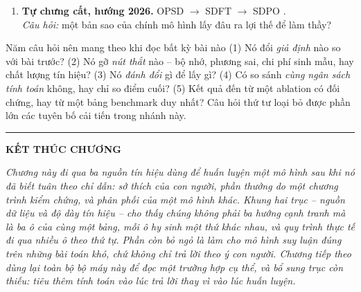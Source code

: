 \begin{enumerate}
	\item \textbf{Tự chưng cất, hướng 2026.} OPSD \cite{zhao2026opsd} $\rightarrow$ SDFT \cite{shenfeld2026sdft} $\rightarrow$ SDPO \cite{huebotter2026sdpo}.\\
	\emph{Câu hỏi:} một bản sao của chính mô hình lấy đâu ra lợi thế để làm thầy?
\end{enumerate}

\begin{deepdive}{Năm câu hỏi nên mang theo khi đọc bất kỳ bài nào}
(1) Nó đổi \emph{giả định} nào so với bài trước? (2) Nó gỡ \emph{nút thắt} nào -- bộ nhớ, phương sai, chi phí sinh mẫu, hay chất lượng tín hiệu? (3) Nó \emph{đánh đổi} gì để lấy gì? (4) Có so sánh \emph{cùng ngân sách tính toán} không, hay chỉ so điểm cuối? (5) Kết quả đến từ một ablation có đối chứng, hay từ một bảng benchmark duy nhất? Câu hỏi thứ tư loại bỏ được phần lớn các tuyên bố cải tiến trong nhánh này.
\end{deepdive}

\bigskip
\hrule
\bigskip

\begin{center}
	\textbf{\Large KẾT THÚC CHƯƠNG \thechapter}
\end{center}

\textit{Chương này đi qua ba nguồn tín hiệu dùng để huấn luyện một mô hình sau khi nó đã biết tuân theo chỉ dẫn: sở thích của con người, phần thưởng do một chương trình kiểm chứng, và phân phối của một mô hình khác. Khung hai trục -- nguồn dữ liệu và độ dày tín hiệu -- cho thấy chúng không phải ba hướng cạnh tranh mà là ba ô của cùng một bảng, mỗi ô hy sinh một thứ khác nhau, và quy trình thực tế đi qua nhiều ô theo thứ tự. Phần còn bỏ ngỏ là làm cho mô hình \emph{suy luận đúng} trên những bài toán khó, chứ không chỉ \emph{trả lời theo ý con người}. Chương tiếp theo dùng lại toàn bộ bộ máy này để đọc một trường hợp cụ thể, và bổ sung trục còn thiếu: tiêu thêm tính toán vào lúc trả lời thay vì vào lúc huấn luyện.}
